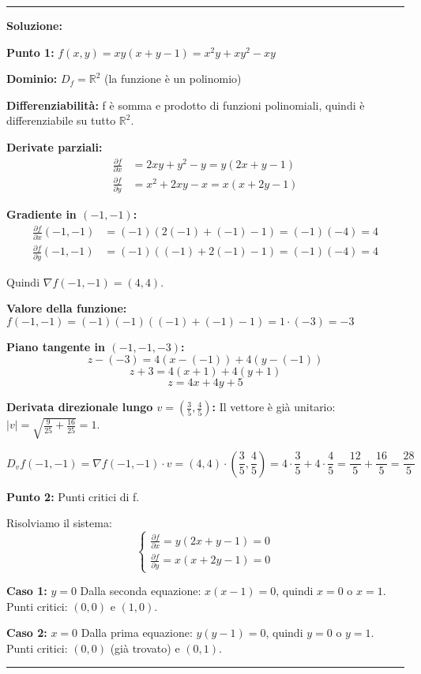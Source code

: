 \documentclass[12pt, a4paper]{article}
\newenvironment{solution}
{\par\noindent\rule{\textwidth}{0.4pt}\par\textbf{Soluzione:}\medskip\par}
{\par\rule{\textwidth}{0.4pt}\par\bigskip}
\begin{document}
\begin{solution}
\textbf{Punto 1:} $f(x,y) = xy(x+y-1) = x^2y + xy^2 - xy$

\textbf{Dominio:} $D_f = \mathbb{R}^2$ (la funzione è un polinomio)

\textbf{Differenziabilità:} f è somma e prodotto di funzioni polinomiali, quindi è differenziabile su tutto $\mathbb{R}^2$.

\textbf{Derivate parziali:}
\begin{align}
\frac{\partial f}{\partial x} &= 2xy + y^2 - y = y(2x + y - 1) \\
\frac{\partial f}{\partial y} &= x^2 + 2xy - x = x(x + 2y - 1)
\end{align}

\textbf{Gradiente in $(-1,-1)$:}
\begin{align}
\frac{\partial f}{\partial x}(-1,-1) &= (-1)(2(-1) + (-1) - 1) = (-1)(-4) = 4 \\
\frac{\partial f}{\partial y}(-1,-1) &= (-1)((-1) + 2(-1) - 1) = (-1)(-4) = 4
\end{align}

Quindi $\nabla f(-1,-1) = (4, 4)$.

\textbf{Valore della funzione:}
$f(-1,-1) = (-1)(-1)((-1) + (-1) - 1) = 1 \cdot (-3) = -3$

\textbf{Piano tangente in $(-1,-1,-3)$:}
\[
z - (-3) = 4(x - (-1)) + 4(y - (-1))
\]
\[
z + 3 = 4(x + 1) + 4(y + 1)
\]
\[
z = 4x + 4y + 5
\]

\textbf{Derivata direzionale lungo $v = (\frac{3}{5}, \frac{4}{5})$:}
Il vettore è già unitario: $|v| = \sqrt{\frac{9}{25} + \frac{16}{25}} = 1$.

\[
D_v f(-1,-1) = \nabla f(-1,-1) \cdot v = (4, 4) \cdot \left(\frac{3}{5}, \frac{4}{5}\right) = 4 \cdot \frac{3}{5} + 4 \cdot \frac{4}{5} = \frac{12}{5} + \frac{16}{5} = \frac{28}{5}
\]

\textbf{Punto 2:} Punti critici di f.

Risolviamo il sistema:
\[
\begin{cases}
\frac{\partial f}{\partial x} = y(2x + y - 1) = 0 \\
\frac{\partial f}{\partial y} = x(x + 2y - 1) = 0
\end{cases}
\]

\textbf{Caso 1:} $y = 0$
Dalla seconda equazione: $x(x - 1) = 0$, quindi $x = 0$ o $x = 1$.
Punti critici: $(0, 0)$ e $(1, 0)$.

\textbf{Caso 2:} $x = 0$
Dalla prima equazione: $y(y - 1) = 0$, quindi $y = 0$ o $y = 1$.
Punti critici: $(0, 0)$ (già trovato) e $(0, 1)$.


\end{solution}
\end{document}
